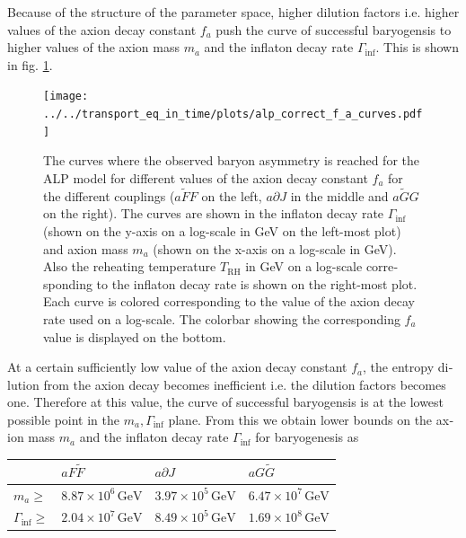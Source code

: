 \documentclass[master,       %
               twoside,        %
               BCOR10mm,       %
               english,ngerman, %
               ]{GAUBM}
\begin{document}
\begin{otherlanguage}{english}
Because of the structure of the parameter space, higher dilution factors i.e. higher values of the axion decay constant $f_a$ push the curve of successful baryogensis to higher values of the axion mass $m_a$ and the inflaton decay rate $\Gamma_\mathrm{inf}$. This is shown in fig. \ref{fig:apl_correct_f_a_curves}.
\begin{figure}[H]
	\texttt{[image: ../../transport\_eq\_in\_time/plots/alp\_correct\_f\_a\_curves.pdf]}
	\caption{The curves where the observed baryon asymmetry is reached for the ALP model for different values of the axion decay constant $f_a$ for the different couplings ($a \tilde{F} F$ on the left, $a \partial J$ in the middle and $a \tilde{G} G$ on the right). The curves are shown in the inflaton decay rate $\Gamma_\mathrm{inf}$ (shown on the y-axis on a log-scale in GeV on the left-most plot) and axion mass $m_a$ (shown on the x-axis on a log-scale in GeV). Also the reheating temperature $T_{\mathrm{RH}}$ in GeV on a log-scale corresponding to the inflaton decay rate is shown on the right-most plot.
		Each curve is colored corresponding to the value of the axion decay rate used on a log-scale. The colorbar showing the corresponding $f_a$ value is displayed on the bottom.}
	\label{fig:apl_correct_f_a_curves}
\end{figure}
At a certain sufficiently low value of the axion decay constant $f_a$, the entropy dilution from the axion decay becomes inefficient i.e. the dilution factors becomes one.
Therefore at this value, the curve of successful baryogensis is at the lowest possible point in the $m_a, \Gamma_\mathrm{inf}$ plane. From this we obtain lower bounds on the axion mass $m_a$ and the inflaton decay rate $\Gamma_\mathrm{inf}$ for baryogenesis as
\begin{table}[H]
	\begin{center}
		\begin{tabular}{l|lll}
			& $a F \tilde{F}$ & $a \partial J$ & $a G \tilde{G}$ \\
			\hline
            $m_a \ge$                 & $8.87 \times 10^{6} \, \mathrm{GeV}$ & $3.97 \times 10^{5} \, \mathrm{GeV}$ & $6.47 \times 10^{7} \, \mathrm{GeV}$ \\
			$\Gamma_\mathrm{inf} \ge$ & $2.04 \times 10^{7} \, \mathrm{GeV}$ & $8.49 \times 10^{5} \, \mathrm{GeV}$ & $1.69 \times 10^{8} \, \mathrm{GeV}$ \\
		\end{tabular}
	\end{center}
\end{table}

\end{otherlanguage}
\end{document}

